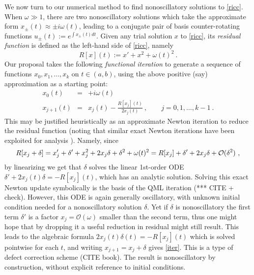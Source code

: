 \documentclass[10pt]{article}
\newcommand{\be}{\begin{equation}}
\newcommand{\ee}{\end{equation}}
\newcommand{\bea}{\begin{eqnarray}}
\newcommand{\eea}{\end{eqnarray}}
\newcommand{\bigO}{{\mathcal O}}
\newcommand{\om}{\omega}
\begin{document}
We now turn to our numerical method to find nonoscillatory
solutions to \eqref{ricc}.
When $\om\gg 1$, there are two nonoscillatory solutions
which take the approximate form
$x_{\pm}(t) \approx \pm i\om(t)$, leading to a conjugate pair of basis
counter-rotating functions $u_{\pm}(t) := e^{\int x_\pm(t) dt}$.
Given any trial solution $x$ to \eqref{ricc}, its \textit{residual
  function} is defined as the left-hand side of \eqref{ricc}, namely
\be
R[x](t) := x' + x^2 + \om(t)^2~.
\label{R}
\ee
Our proposal takes the following \textit{functional iteration}
to generate a sequence of functions $x_0, x_1, \dots, x_k$
on $t\in(a,b)$,
using the above positive (say) approximation as a starting point:
\bea
x_0(t) &=& +i\om(t)
\label{init}
\\
x_{j+1}(t) &=& x_j(t) - \frac{R[x_j](t)}{2 x_j(t)}
~,\qquad j=0,1,\dots,k-1~.
\label{iter}
\eea
This may be justified heuristically as an approximate Newton
iteration to reduce the residual function
(noting that similar exact Newton iterations have been
exploited for analysis \cite{Heit15}).
Namely, since
$$
R[x_j + \delta] = x_j' + \delta' + x_j^2 + 2 x_j \delta + \delta^2 + \om(t)^2\\
= R[x_j] + \delta' + 2x_j\delta + \bigO(\delta^2)~,
$$
by linearizing we get that $\delta$ solves the linear 1st-order ODE
$\delta' + 2x_j(t) \delta  = -R[x_j](t)$,
which has an analytic solution.
Solving this exact Newton update symbolically is the basis of the QML iteration
(*** CITE + check).
However, this ODE is again generally oscillatory,
with unknown initial condition needed for a nonoscillatory solution $\delta$.
Yet if $\delta$ is nonoscillatory the first term $\delta'$ is
a factor $x_j = \bigO(\om)$ smaller than the second term, thus
one might hope that by dropping it a useful reduction in residual might
still result.
This leads to the algebraic formula $2x_j(t) \delta(t) = -R[x_j](t)$
which is solved pointwise for each $t$, and
writing $x_{j+1} = x_j + \delta$ gives \eqref{iter}.
This is a type of defect correction scheme (CITE book).
The result is nonoscillatory by construction, without explicit reference
to initial conditions.
\end{document}
